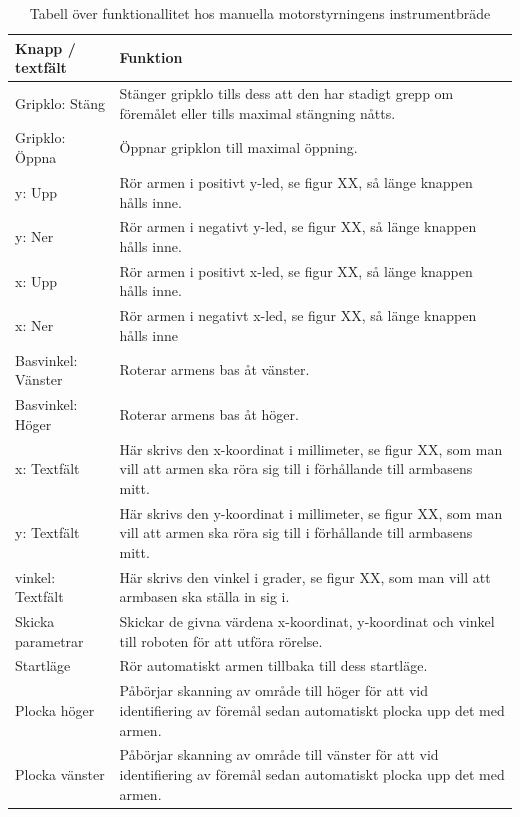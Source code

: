 \documentclass[a4paper,12pt]{article}
\begin{document}
\begin{table}[H]
    \centering
    \begin{tabularx}{\textwidth}{|l|X|}
        \hline \textbf{Knapp / textfält} & \textbf{Funktion} \\ \hline
        Gripklo: Stäng& Stänger gripklo tills dess att den har stadigt grepp om föremålet eller tills maximal stängning nåtts. \\ \hline
        Gripklo: Öppna& Öppnar gripklon till maximal öppning. \\ \hline
        y: Upp & Rör armen i positivt y-led, se figur XX, så länge knappen hålls inne. \\ \hline
        y: Ner & Rör armen i negativt y-led, se figur XX, så länge knappen hålls inne. \\ \hline
        x: Upp & Rör armen i positivt x-led, se figur XX, så länge knappen hålls inne. \\ \hline
        x: Ner & Rör armen i negativt x-led, se figur XX, så länge knappen hålls inne \\ \hline
        Basvinkel: Vänster & Roterar armens bas åt vänster. \\ \hline
        Basvinkel: Höger & Roterar armens bas åt höger. \\ \hline
        x: Textfält & Här skrivs den x-koordinat i millimeter, se figur XX, som man vill att armen ska röra sig till i förhållande till armbasens mitt. \\ \hline
        y: Textfält & Här skrivs den y-koordinat i millimeter, se figur XX, som man vill att armen ska röra sig till i förhållande till armbasens mitt. \\ \hline
        vinkel: Textfält & Här skrivs den vinkel i grader, se figur XX, som man vill att armbasen ska ställa in sig i. \\ \hline
        Skicka parametrar & Skickar de givna värdena x-koordinat, y-koordinat och vinkel till roboten för att utföra rörelse. \\ \hline
        Startläge & Rör automatiskt armen tillbaka till dess startläge. \\ \hline
        Plocka höger & Påbörjar skanning av område till höger för att vid identifiering av föremål sedan automatiskt plocka upp det med armen. \\ \hline
        Plocka vänster & Påbörjar skanning av område till vänster för att vid identifiering av föremål sedan automatiskt plocka upp det med armen. \\ \hline
    \end{tabularx}
\caption{Tabell över funktionallitet hos manuella motorstyrningens instrumentbräde}
\label{tab:arm}
\end{table}
\end{document}
